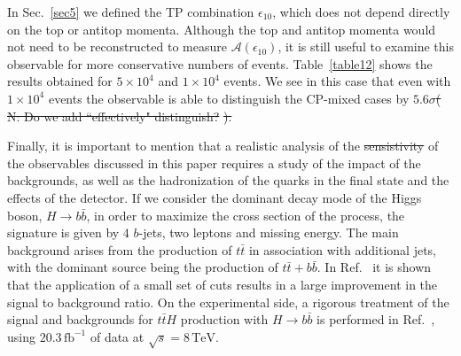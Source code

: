 \documentclass[aps,preprint,tightenlines,floatfix,superscriptaddress,nofootinbib,showpacs]{revtex4-1}
\def\tbar{\bar{t}}
\def\bbar{\bar{b}}
\providecommand{\DIFadd}[1]{{\protect\color{blue}\uwave{#1}}} %
\providecommand{\DIFdel}[1]{{\protect\color{red}\sout{#1}}}                      %
\providecommand{\DIFaddbegin}{} %
\providecommand{\DIFaddend}{} %
\providecommand{\DIFdelbegin}{} %
\providecommand{\DIFdelend}{} %
\begin{document}
In Sec.~\ref{sec5} we defined the TP combination $\epsilon_{10}$,
which does not depend directly on the top or antitop momenta.
Although the top and antitop momenta would not need to be
reconstructed to measure $\mathcal{A}(\epsilon_{10})$,
it is still useful to examine this observable for more
conservative numbers of events. Table~\ref{table12} shows the
results obtained for 
$5\times 10^4$ and $1\times 10^4$ events. We see in this case
that even with $1\times 10^4$ events the observable is
able to distinguish the $\mathrm{CP}$-mixed cases by
$5.6\sigma$\DIFdelbegin \DIFdel{(}%
\DIFdel{N: Do we add ``effectively" distinguish?}%
\DIFdel{).
}%
\DIFdelend \DIFaddbegin \DIFadd{.
}\DIFaddend 

Finally, it is important to mention that a realistic
analysis of the \DIFdelbegin \DIFdel{sensistivity }\DIFdelend \DIFaddbegin \DIFadd{sensitivity }\DIFaddend of the observables discussed in this
paper requires a study of the impact of the backgrounds, as well as
the hadronization of the quarks in the final state and the effects of
the detector. If we consider the dominant decay mode of the Higgs boson,
$H\rightarrow b\bbar$, in order to maximize the cross section of the
process, the signature is given by $4$ $b$-jets, two leptons and
missing energy.  The main background arises from the production of
$t\tbar$ in association with additional jets, with the dominant
source being the production of $t\tbar + b\bbar$.
In Ref.~\cite{chinos} it is shown that the application of a small
set of cuts results in a large improvement in the signal to background
ratio.  
On the experimental side, a
rigorous treatment of the signal and backgrounds
for $t\tbar H$ production with $H\to b\bbar$ 
is performed in Ref.~\cite{atlasger}, using $20.3\,
\mathrm{fb}^{-1}$ of data at $\sqrt{s}=8\,\mathrm{TeV}$.
\end{document}
